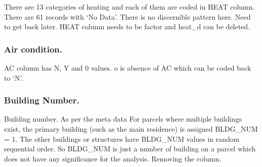 \documentclass[]{article}
\newenvironment{Shaded}{\begin{snugshade}}{\end{snugshade}}
\newcommand{\CommentTok}[1]{\textcolor[rgb]{0.56,0.35,0.01}{\textit{#1}}}
\newcommand{\DataTypeTok}[1]{\textcolor[rgb]{0.13,0.29,0.53}{#1}}
\newcommand{\DecValTok}[1]{\textcolor[rgb]{0.00,0.00,0.81}{#1}}
\newcommand{\KeywordTok}[1]{\textcolor[rgb]{0.13,0.29,0.53}{\textbf{#1}}}
\newcommand{\NormalTok}[1]{#1}
\newcommand{\OperatorTok}[1]{\textcolor[rgb]{0.81,0.36,0.00}{\textbf{#1}}}
\newcommand{\StringTok}[1]{\textcolor[rgb]{0.31,0.60,0.02}{#1}}
\begin{document}
There are 13 categories of heating and each of them are coded in HEAT
column. There are 61 records with `No Data'. There is no discernible
pattern here. Need to get back later. HEAT column needs to be factor and
heat\_d can be deleted.

\begin{Shaded}
\end{Shaded}

\hypertarget{air-condition.}{%
\subsubsection{Air condition.}\label{air-condition.}}

AC column has N, Y and 0 values. o is absence of AC which can be coded
back to `N'.

\begin{Shaded}
\end{Shaded}

\hypertarget{building-number.}{%
\subsubsection{Building Number.}\label{building-number.}}

Building number. As per the meta data For parcels where multiple
buildings exist, the primary building (such as the main residence) is
assigned BLDG\_NUM = 1. The other buildings or structures have BLDG\_NUM
values in random sequential order. So BLDG\_NUM is just a number of
building on a parcel which does not have any significance for the
analysis. Removing the column.
\end{document}
